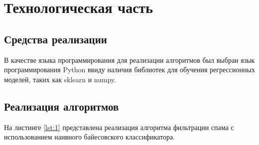 \chapter{Технологическая часть}

\section{Средства реализации}

В качестве языка программирования для реализации алгоритмов был выбран язык программирования Python ввиду наличия библиотек для обучения регрессионных моделей, таких как sklearn и numpy.

\section{Реализация алгоритмов}

На листинге \ref{lst:1} представлена реализация алгоритма фильтрации спама с использованием наивного байесовского классификатора.

